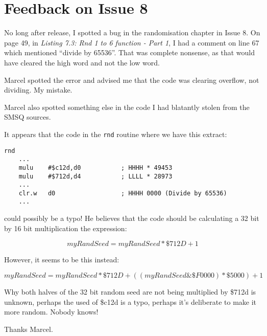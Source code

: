 
\chapter{Feedback on Issue 8}

No long after release, I spotted a bug in the randomisation chapter
in Issue 8. On page 49, in \emph{Listing 7.3: Rnd 1 to 6 function
- Part 1}, I had a comment on line 67 which mentioned ``divide by
65536''. That was complete nonsense, as that would have cleared the
high word and not the low word. 

Marcel spotted the error and advised me that the code was clearing
overflow, not dividing. My mistake.

Marcel also spotted something else in the code I had blatantly stolen
from the SMSQ sources.

It appears that the code in the \lstinline!rnd! routine where we
have this extract:

\begin{lstlisting}[caption={Rnd 1 to 6 function},numbers=none]
rnd
    ...
    mulu    #$c12d,d0           ; HHHH * 49453
    mulu    #$712d,d4           ; LLLL * 28973
	...
    clr.w   d0                  ; HHHH 0000 (Divide by 65536)
	...
\end{lstlisting}

could possibly be a typo! He believes that the code should be calculating
a 32 bit by 16 bit multiplication \textendash{} the expression:

\[
myRandSeed=myRandSeed*\$712D+1
\]

However, it seems to be this instead:

\[
myRandSeed=myRandSeed*\$712D+\left(\left(myRandSeed\&\$F0000\right)*\$5000\right)+1
\]

Why both halves of the 32 bit random seed are not being multiplied
by \$712d is unknown, perhaps the used of \$c12d is a typo, perhaps
it's deliberate to make it more random. Nobody knows!

Thanks Marcel.
